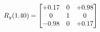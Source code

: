 \documentclass[preview]{standalone}
\begin{document}
\begin{align*}
\special{dvisvgm:raw <g id='unique000'>}R_{y}(1.40) = \begin{bmatrix}+0.17 & 0 & +0.98 \\0 & 1 & 0 \\-0.98 & 0 & +0.17\end{bmatrix}\special{dvisvgm:raw </g>}
\end{align*}
\end{document}
